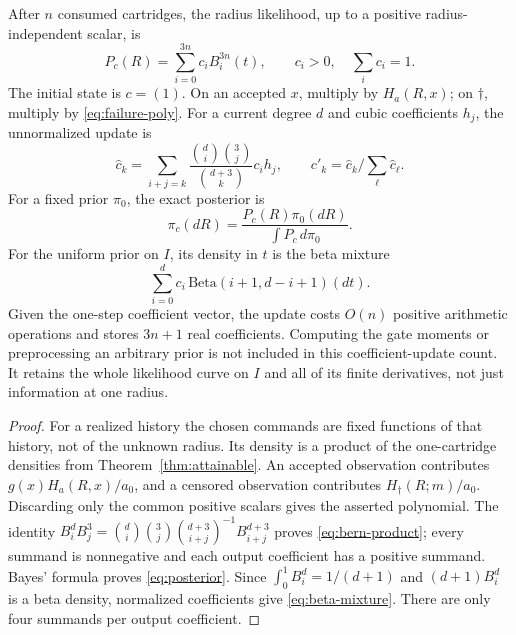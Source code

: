 \begin{theorem}\label{thm:filter}
After $n$ consumed cartridges, the radius likelihood, up to a positive
radius-independent scalar, is
\[
 P_c(R)=\sum_{i=0}^{3n}c_iB_i^{3n}(t),\qquad c_i>0,\quad\sum_i c_i=1.
\]
The initial state is $c=(1)$. On an accepted $x$, multiply by $H_a(R,x)$;
on $\dagger$, multiply by \eqref{eq:failure-poly}. For a current degree $d$
and cubic coefficients $h_j$, the unnormalized update is
\begin{equation}
 \widehat c_k=\sum_{i+j=k}
 \frac{\binom di\binom3j}{\binom{d+3}k}c_i h_j,
 \qquad c'_k=\widehat c_k/\sum_\ell\widehat c_\ell.
 \label{eq:bern-product}
\end{equation}
For a fixed prior $\pi_0$, the exact posterior is
\begin{equation}
 \pi_c(dR)=\frac{P_c(R)\pi_0(dR)}{\int P_c\,d\pi_0}.
 \label{eq:posterior}
\end{equation}
For the uniform prior on $I$, its density in $t$ is the beta mixture
\begin{equation}
 \sum_{i=0}^d c_i\,\mathrm{Beta}(i+1,d-i+1)(dt).
 \label{eq:beta-mixture}
\end{equation}
Given the one-step coefficient vector, the update costs $O(n)$ positive
arithmetic operations and stores $3n+1$ real coefficients. Computing the
gate moments or preprocessing an arbitrary prior is not included in this
coefficient-update count. It retains the whole likelihood curve on $I$ and all of
its finite derivatives, not just information at one radius.
\end{theorem}
\begin{proof}
For a realized history the chosen commands are fixed functions of that
history, not of the unknown radius. Its density is a product of the
one-cartridge densities from Theorem~\ref{thm:attainable}. An accepted
observation contributes $g(x)H_a(R,x)/a_0$, and a censored observation
contributes $H_\dagger(R;m)/a_0$. Discarding only the common positive scalars
gives the asserted polynomial. The identity
$B_i^dB_j^3=\binom di\binom3j\binom{d+3}{i+j}^{-1}B_{i+j}^{d+3}$ proves
\eqref{eq:bern-product}; every summand is nonnegative and each output
coefficient has a positive summand. Bayes' formula proves
\eqref{eq:posterior}. Since $\int_0^1 B_i^d=1/(d+1)$ and
$(d+1)B_i^d$ is a beta density, normalized coefficients give
\eqref{eq:beta-mixture}. There are only four summands per output coefficient.
\end{proof}


